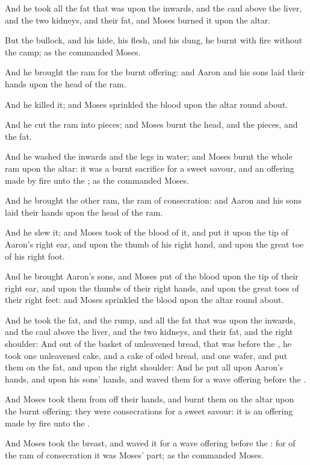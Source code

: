 \verse And he took all the fat that was upon the inwards, and the caul above the liver, and the two kidneys, and their fat, and Moses burned it upon the altar.

\verse But the bullock, and his hide, his flesh, and his dung, he burnt with fire without the camp; as the \LORD commanded Moses.

\verse And he brought the ram for the burnt offering: and Aaron and his sons laid their hands upon the head of the ram.

\verse And he killed it; and Moses sprinkled the blood upon the altar round about.

\verse And he cut the ram into pieces; and Moses burnt the head, and the pieces, and the fat.

\verse And he washed the inwards and the legs in water; and Moses burnt the whole ram upon the altar: it was a burnt sacrifice for a sweet savour, and an offering made by fire unto the \LORD; as the \LORD commanded Moses.

\verse And he brought the other ram, the ram of consecration: and Aaron and his sons laid their hands upon the head of the ram.

\verse And he slew it; and Moses took of the blood of it, and put it upon the tip of Aaron's right ear, and upon the thumb of his right hand, and upon the great toe of his right foot.

\verse And he brought Aaron's sons, and Moses put of the blood upon the tip of their right ear, and upon the thumbs of their right hands, and upon the great toes of their right feet: and Moses sprinkled the blood upon the altar round about.

\verse And he took the fat, and the rump, and all the fat that was upon the inwards, and the caul above the liver, and the two kidneys, and their fat, and the right shoulder: \verse And out of the basket of unleavened bread, that was before the \LORD, he took one unleavened cake, and a cake of oiled bread, and one wafer, and put them on the fat, and upon the right shoulder: \verse And he put all upon Aaron's hands, and upon his sons' hands, and waved them for a wave offering before the \LORD.

\verse And Moses took them from off their hands, and burnt them on the altar upon the burnt offering: they were consecrations for a sweet savour: it is an offering made by fire unto the \LORD.

\verse And Moses took the breast, and waved it for a wave offering before the \LORD: for of the ram of consecration it was Moses' part; as the \LORD commanded Moses.

